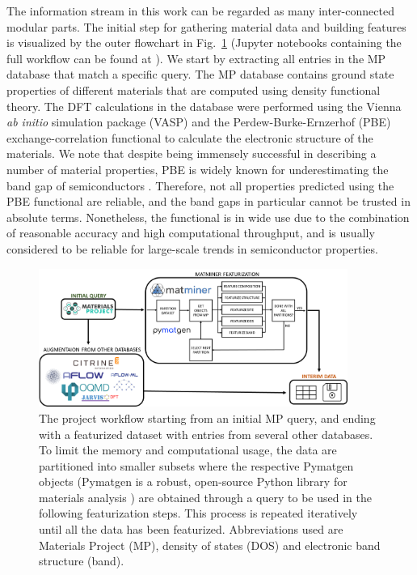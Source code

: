 \documentclass[superscriptaddress,unsortedaddress,
 amsmath,amssymb,
 aps,
]{revtex4-2}
\begin{document}
The information stream in this work can be regarded as many inter-connected modular parts. 
The initial step for gathering material data and building features is visualized by the outer flowchart in Fig.~\ref{fig:flowchart} (Jupyter notebooks containing the full
workflow can be found at \cite{Ohebbi2021}).
We start by extracting all entries in the MP database that match a specific query. 
The MP database contains ground state properties of different materials that are computed using density functional theory. The DFT calculations in the database were performed using the Vienna {\em ab initio} simulation package (VASP) \cite{Kresse1996} and the Perdew-Burke-Ernzerhof (PBE) \cite{Perdew1996} exchange-correlation functional to calculate the electronic structure of the materials. 
We note that despite being immensely successful in describing a number of material properties, PBE is widely known for underestimating the band gap of semiconductors \cite{Freysoldt2014}. Therefore, not all properties predicted using the PBE functional are reliable, and the band gaps in particular cannot be trusted in absolute terms. Nonetheless, the functional is in wide use due to the combination of reasonable accuracy and high computational throughput, and is usually considered to be reliable for large-scale trends in semiconductor properties. 

\begin{figure}[t]
    \centering
    \includegraphics[width=0.9\textwidth]{figures/flow_chart_2.png}
    \caption{The project workflow starting from an initial MP query, and ending with a featurized dataset with entries from several other databases. 
    To limit the memory and computational usage, the data are partitioned into smaller subsets where the respective Pymatgen objects (Pymatgen is a robust, open-source Python library for materials analysis \cite{pymatgen}) are obtained through a query to be used in the following featurization steps. This process is repeated iteratively until all the data has been featurized. Abbreviations used are Materials Project (MP), density of states (DOS) and electronic band structure (band).
    }
    \label{fig:flowchart}
\end{figure}
\end{document}
